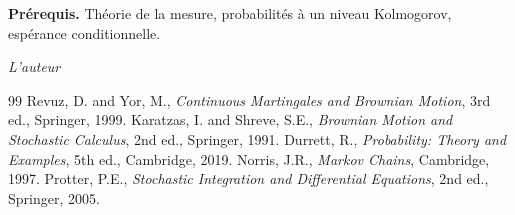 \documentclass[12pt,a4paper,twoside]{book}
\theoremstyle{definition}
\theoremstyle{plain}
\theoremstyle{remark}
\begin{document}
\medskip

\noindent\textbf{Pr\'erequis.} Th\'eorie de la mesure, probabilit\'es \`a un niveau Kolmogorov, esp\'erance conditionnelle.

\vfill
\hfill\textit{L'auteur}


\mainmatter














\backmatter
\begin{thebibliography}{99}
 Revuz, D. and Yor, M., \emph{Continuous Martingales and Brownian Motion}, 3rd ed., Springer, 1999.
 Karatzas, I. and Shreve, S.E., \emph{Brownian Motion and Stochastic Calculus}, 2nd ed., Springer, 1991.
 Durrett, R., \emph{Probability: Theory and Examples}, 5th ed., Cambridge, 2019.
 Norris, J.R., \emph{Markov Chains}, Cambridge, 1997.
 Protter, P.E., \emph{Stochastic Integration and Differential Equations}, 2nd ed., Springer, 2005.
\end{thebibliography}
\printindex
\end{document}
